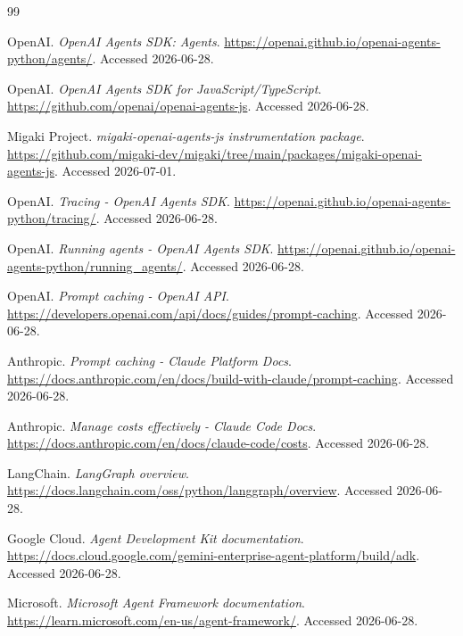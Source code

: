 \begin{thebibliography}{99}

OpenAI.
\newblock \emph{OpenAI Agents SDK: Agents}.
\newblock \url{https://openai.github.io/openai-agents-python/agents/}. Accessed 2026-06-28.

OpenAI.
\newblock \emph{OpenAI Agents SDK for JavaScript/TypeScript}.
\newblock \url{https://github.com/openai/openai-agents-js}. Accessed 2026-06-28.

Migaki Project.
\newblock \emph{migaki-openai-agents-js instrumentation package}.
\newblock \url{https://github.com/migaki-dev/migaki/tree/main/packages/migaki-openai-agents-js}. Accessed 2026-07-01.

OpenAI.
\newblock \emph{Tracing - OpenAI Agents SDK}.
\newblock \url{https://openai.github.io/openai-agents-python/tracing/}. Accessed 2026-06-28.

OpenAI.
\newblock \emph{Running agents - OpenAI Agents SDK}.
\newblock \url{https://openai.github.io/openai-agents-python/running_agents/}. Accessed 2026-06-28.

OpenAI.
\newblock \emph{Prompt caching - OpenAI API}.
\newblock \url{https://developers.openai.com/api/docs/guides/prompt-caching}. Accessed 2026-06-28.

Anthropic.
\newblock \emph{Prompt caching - Claude Platform Docs}.
\newblock \url{https://docs.anthropic.com/en/docs/build-with-claude/prompt-caching}. Accessed 2026-06-28.

Anthropic.
\newblock \emph{Manage costs effectively - Claude Code Docs}.
\newblock \url{https://docs.anthropic.com/en/docs/claude-code/costs}. Accessed 2026-06-28.

LangChain.
\newblock \emph{LangGraph overview}.
\newblock \url{https://docs.langchain.com/oss/python/langgraph/overview}. Accessed 2026-06-28.

Google Cloud.
\newblock \emph{Agent Development Kit documentation}.
\newblock \url{https://docs.cloud.google.com/gemini-enterprise-agent-platform/build/adk}. Accessed 2026-06-28.

Microsoft.
\newblock \emph{Microsoft Agent Framework documentation}.
\newblock \url{https://learn.microsoft.com/en-us/agent-framework/}. Accessed 2026-06-28.


\end{thebibliography}
